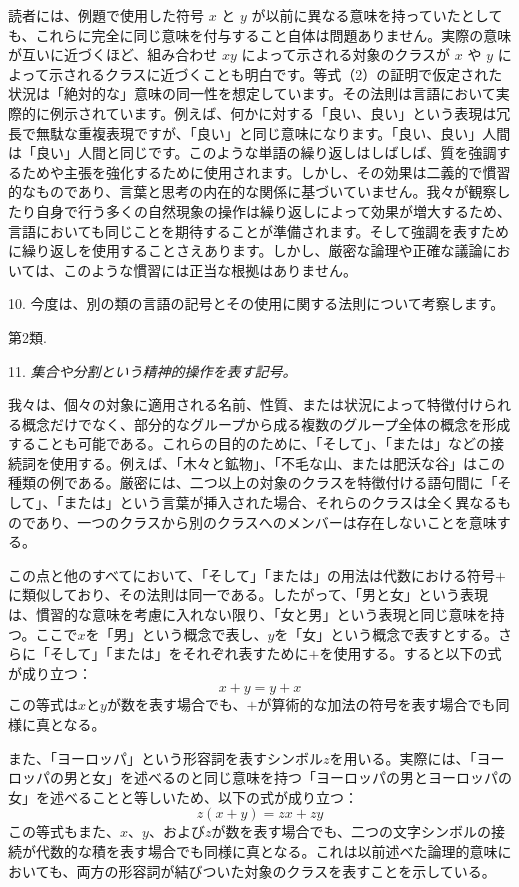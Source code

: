 \documentclass[a4paper,11pt,openany]{ltjsbook}
\begin{document}
読者には、例題で使用した符号 $x$ と $y$ が以前に異なる意味を持っていたとしても、これらに完全に同じ意味を付与すること自体は問題ありません。実際の意味が互いに近づくほど、組み合わせ $xy$ によって示される対象のクラスが $x$ や $y$ によって示されるクラスに近づくことも明白です。等式（2）の証明で仮定された状況は「絶対的な」意味の同一性を想定しています。その法則は言語において実際的に例示されています。例えば、何かに対する「良い、良い」という表現は冗長で無駄な重複表現ですが、「良い」と同じ意味になります。「良い、良い」人間は「良い」人間と同じです。このような単語の繰り返しはしばしば、質を強調するためや主張を強化するために使用されます。しかし、その効果は二義的で慣習的なものであり、言葉と思考の内在的な関係に基づいていません。我々が観察したり自身で行う多くの自然現象の操作は繰り返しによって効果が増大するため、言語においても同じことを期待することが準備されます。そして強調を表すために繰り返しを使用することさえあります。しかし、厳密な論理や正確な議論においては、このような慣習には正当な根拠はありません。

10. 今度は、別の類の言語の記号とその使用に関する法則について考察します。

\begin{center}
\textsc {第2類}.
\end{center}

11. \textit{集合や分割という精神的操作を表す記号。}

我々は、個々の対象に適用される名前、性質、または状況によって特徴付けられる概念だけでなく、部分的なグループから成る複数のグループ全体の概念を形成することも可能である。これらの目的のために、「そして」、「または」などの接続詞を使用する。例えば、「木々と鉱物」、「不毛な山、または肥沃な谷」はこの種類の例である。厳密には、二つ以上の対象のクラスを特徴付ける語句間に「そして」、「または」という言葉が挿入された場合、それらのクラスは全く異なるものであり、一つのクラスから別のクラスへのメンバーは存在しないことを意味する。

この点と他のすべてにおいて、「そして」「または」の用法は代数における符号$+$に類似しており、その法則は同一である。したがって、「男と女」という表現は、慣習的な意味を考慮に入れない限り、「女と男」という表現と同じ意味を持つ。ここで$x$を「男」という概念で表し、$y$を「女」という概念で表すとする。さらに「そして」「または」をそれぞれ表すために$+$を使用する。すると以下の式が成り立つ：
\[
x + y = y + x
\]
この等式は$x$と$y$が数を表す場合でも、$+$が算術的な加法の符号を表す場合でも同様に真となる。

また、「ヨーロッパ」という形容詞を表すシンボル$z$を用いる。実際には、「ヨーロッパの男と女」を述べるのと同じ意味を持つ「ヨーロッパの男とヨーロッパの女」を述べることと等しいため、以下の式が成り立つ：
\[
z(x + y) = zx + zy
\]
この等式もまた、$x$、$y$、および$z$が数を表す場合でも、二つの文字シンボルの接続が代数的な積を表す場合でも同様に真となる。これは以前述べた論理的意味においても、両方の形容詞が結びついた対象のクラスを表すことを示している。
\end{document}
